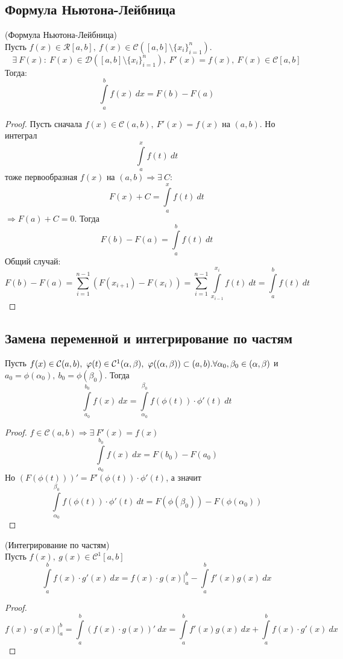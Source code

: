 \subsection{Формула Ньютона-Лейбница}
\begin{theorem} (Формула Ньютона-Лейбница)\\
    Пусть $f(x)\in \mathcal{R}[a,b],\ f(x)\in \mathcal{C}([a,b]\setminus \{x_i\}_{i=1}^{n})$.
    \[\exists\ F(x): \ F(x)\in \mathcal{D}([a,b]\setminus \{x_i\}_{i=1}^{n}),\ F'(x)=f(x),\ F(x)\in \mathcal{C}[a,b]\] 
    Тогда: 
    \[\int\limits_{a}^{b}f(x)\ dx=F(b)-F(a)\]
\end{theorem} 
\begin{proof}
    Пусть сначала $f(x)\in \mathcal{C}(a,b),\ F'(x)=f(x)$ на $(a,b)$. Но интеграл
    \[\int\limits_{a}^{x}f(t)\ dt\]
    тоже первообразная $f(x)$ на $(a,b) \Rightarrow \exists\ C:$
    \[F(x)+C=\int\limits_{a}^{x}f(t)\ dt\]
    $\Rightarrow F(a)+C=0$. Тогда 
    \[F(b)-F(a)=\int\limits_{a}^{b} f(t)\ dt\]
    Общий случай:
        \[F(b)-F(a)=\sum\limits_{i=1}^{n-1}(F(x_{i+1})-F(x_{i}))=\sum\limits_{i=1}^{n-1} \int\limits_{x_{i-1}}^{x_i} f(t)\ dt=\int\limits_{a}^{b} f(t)\ dt\]
\end{proof} 
\subsection{Замена переменной и интегрирование по частям}
\begin{theorem}
    Пусть $f(x)\in \mathcal{C}(a,b),\ \phi(t)\in \mathcal{C}^1(\alpha, \beta),\ \phi((\alpha, \beta))\subset (a,b).\\
    \forall \alpha_0, \beta_0\in (\alpha, \beta)$ и $a_0=\phi(\alpha_0),\ b_0=\phi(\beta_0)$. Тогда
    \[\int\limits_{a_0}^{b_0}f(x)\ dx=\int\limits_{\alpha_0}^{\beta_0}f(\phi(t))\cdot \phi'(t)\ dt\]
\end{theorem} 
\begin{proof}
    $f\in \mathcal{C}(a,b) \Rightarrow \exists\ F'(x)=f(x)$
    \[\int\limits_{a_0}^{b_0}f(x)\ dx= F(b_0)-F(a_0)\]
    Но $(F(\phi(t)))'=F'(\phi(t))\cdot \phi'(t)$, а значит
    \[\int\limits_{\alpha_0}^{\beta_0}f(\phi(t))\cdot\phi'(t)\ dt=F(\phi(\beta_0))-F(\phi(\alpha_0))\]
\end{proof} 
\begin{theorem} (Интегрирование по частям)\\
    Пусть $f(x),\ g(x)\in \mathcal{C}^1[a,b]$
    \[\int\limits_{a}^{b}f(x)\cdot g'(x)\ dx=f(x)\cdot g(x)|_a^b-\int\limits_{a}^{b}f'(x)g(x)\ dx\]
\end{theorem} 
\begin{proof}
    \[f(x)\cdot g(x)|_a^b=\int\limits_{a}^{b}(f(x)\cdot g(x))'\ dx=\int\limits_{a}^{b}f'(x)g(x)\ dx+\int\limits_{a}^{b}f(x)\cdot g'(x)\ dx\]
\end{proof} 
\newpage
